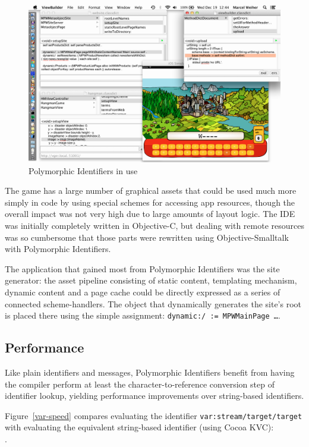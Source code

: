 \documentclass[preprint]{sigplanconf}
\begin{document}
\begin{figure}[htbp]
\centering
\includegraphics[scale=0.50,page=1]{PolymorphicIdentifiersInUse.png}
\caption{Polymorphic Identifiers in use}
\label{pi-inuse}
\end{figure}


The game has a large number of graphical assets that could be used much more simply in code by using special schemes for accessing app
resources, though the overall impact was not very high due to large amounts of layout logic. 
 The IDE was initially completely written in Objective-C, but dealing with remote resources was so cumbersome that
those parts were rewritten using Objective-Smalltalk with Polymorphic Identifiers.

The application that gained most from Polymorphic Identifiers was the site generator:  the asset pipeline consisting of static
content, templating mechanism, dynamic content and a page cache could be directly expressed as a series of connected
scheme-handlers.  The object that dynamically generates the site's root is placed there using the simple assignment: {\tt dynamic:/  := MPWMainPage \dots}.


\subsection{Performance}

Like plain identifiers and messages, Polymorphic Identifiers benefit from having the compiler perform
at least the character-to-reference conversion step of identifier lookup, yielding performance 
improvements over string-based identifiers.

\sloppy
Figure~\ref{var-speed} compares evaluating the identifier {\tt var:stream/target/target} with evaluating the  
equivalent string-based identifier (using Cocoa KVC): \\  { . }
\fussy
\end{document}
